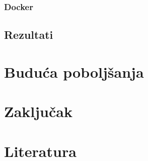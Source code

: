 \documentclass[a4paper,12pt,titlepage]{article}
\begin{document}
	\subsubsection{Docker}
	\subsection{Rezultati}
	
	\section{Buduća poboljšanja}
	\newpage
	
	\section{Zaključak}
	\newpage
	
	\section*{Literatura}
	\newpage
\end{document}
